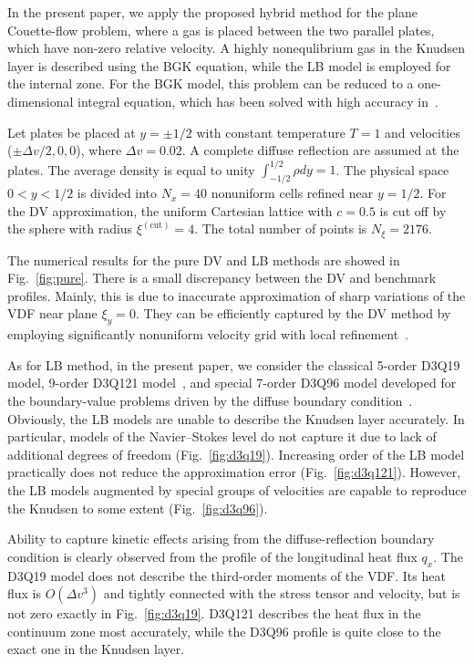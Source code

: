 \documentclass[]{elsarticle} %
\newcommand{\OO}[1]{O(#1)}
\begin{document}
{%
In the present paper, we apply the proposed hybrid method for the plane Couette-flow problem,
where a gas is placed between the two parallel plates, which have non-zero relative velocity.
A highly nonequlibrium gas in the Knudsen layer is described using the BGK equation, while the LB model is employed for the internal zone.
For the BGK model, this problem can be reduced to a one-dimensional integral equation,
which has been solved with high accuracy in~\cite{Luo2015, Luo2016}.

Let plates be placed at $y = \pm 1/2$ with constant temperature $T = 1$ and velocities ($\pm\Delta v/2,0,0$), where $\Delta v=0.02$.
A complete diffuse reflection are assumed at the plates.
The average density is equal to unity $\int_{-1/2}^{1/2}\rho dy=1$.
The physical space $0 < y < 1/2$ is divided into $N_x = 40$ nonuniform cells refined near $y = 1/2$.
For the DV approximation, the uniform Cartesian lattice with $c=0.5$ is cut off by the sphere with radius $\xi^{(\mathrm{cut})}=4$.
The total number of points is $N_\xi=2176$.

The numerical results for the pure DV and LB methods are showed in Fig.~\ref{fig:pure}.
There is a small discrepancy between the DV and benchmark profiles.
Mainly, this is due to inaccurate approximation of sharp variations of the VDF near plane \(\xi_y=0\).
They can be efficiently captured by the DV method by employing significantly nonuniform velocity grid
with local refinement~\cite{Ohwada1990, Rogozin2016}.

As for LB method, in the present paper, we consider the classical 5-order D3Q19 model, 9-order D3Q121 model~\cite{Shan2010},
and special 7-order D3Q96 model developed for the boundary-value problems driven by the diffuse boundary condition~\cite{Feuchter2016}.
Obviously, the LB models are unable to describe the Knudsen layer accurately.
In particular, models of the Navier--Stokes level do not capture it due to lack of additional degrees of freedom (Fig.~\ref{fig:d3q19}).
Increasing order of the LB model practically does not reduce the approximation error (Fig.~\ref{fig:d3q121}).
However, the LB models augmented by special groups of velocities are capable to reproduce the Knudsen to some extent (Fig.~\ref{fig:d3q96}).

Ability to capture kinetic effects arising from the diffuse-reflection boundary condition
is clearly observed from the profile of the longitudinal heat flux \(q_x\).
The D3Q19 model does not describe the third-order moments of the VDF.
Its heat flux is \(\OO{\Delta v^3}\) and tightly connected with the stress tensor and velocity, but is not zero exactly in Fig.~\ref{fig:d3q19}.
D3Q121 describes the heat flux in the continuum zone most accurately, while the D3Q96 profile is quite close to the exact one in the Knudsen layer.

}
\end{document}

